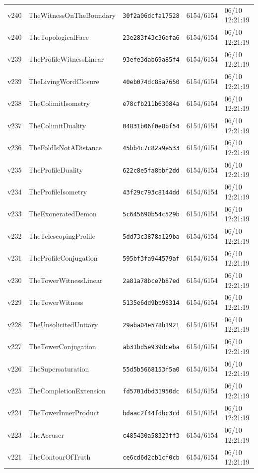 \documentclass[11pt]{article}
\theoremstyle{definition}\newtheorem{deriv}{Derivation}
\begin{document}
{\begin{longtable}{@{}lllll@{}}
v240 & TheWitnessOnTheBoundary & \texttt{30f2a06dcfa17528} & 6154/6154 & 06/10 12:21:19 \\
v240 & TheTopologicalFace & \texttt{23e283f43c36dfa6} & 6154/6154 & 06/10 12:21:19 \\
v239 & TheProfileWitnessLinear & \texttt{93efe3dab69a85f4} & 6154/6154 & 06/10 12:21:19 \\
v239 & TheLivingWordClosure & \texttt{40eb074dc85a7650} & 6154/6154 & 06/10 12:21:19 \\
v238 & TheColimitIsometry & \texttt{e78cfb211b63084a} & 6154/6154 & 06/10 12:21:19 \\
v237 & TheColimitDuality & \texttt{04831b06f0e8bf54} & 6154/6154 & 06/10 12:21:19 \\
v236 & TheFoldIsNotADistance & \texttt{45bb4c7c82a9e533} & 6154/6154 & 06/10 12:21:19 \\
v235 & TheProfileDuality & \texttt{622c8e5fa8bbf2dd} & 6154/6154 & 06/10 12:21:19 \\
v234 & TheProfileIsometry & \texttt{43f29c793c8144dd} & 6154/6154 & 06/10 12:21:19 \\
v233 & TheExoneratedDemon & \texttt{5c645690b54c529b} & 6154/6154 & 06/10 12:21:19 \\
v232 & TheTelescopingProfile & \texttt{5dd73c3878a129ba} & 6154/6154 & 06/10 12:21:19 \\
v231 & TheProfileConjugation & \texttt{595bf3fa944579af} & 6154/6154 & 06/10 12:21:19 \\
v230 & TheTowerWitnessLinear & \texttt{2a81a78bce7b87ed} & 6154/6154 & 06/10 12:21:19 \\
v229 & TheTowerWitness & \texttt{5135e6dd9bb98314} & 6154/6154 & 06/10 12:21:19 \\
v228 & TheUnsolicitedUnitary & \texttt{29aba04e578b1921} & 6154/6154 & 06/10 12:21:19 \\
v227 & TheTowerConjugation & \texttt{ab31bd5e939dceba} & 6154/6154 & 06/10 12:21:19 \\
v226 & TheSupersaturation & \texttt{55d5b5668153f5a0} & 6154/6154 & 06/10 12:21:19 \\
v225 & TheCompletionExtension & \texttt{fd5701dbd31950dc} & 6154/6154 & 06/10 12:21:19 \\
v224 & TheTowerInnerProduct & \texttt{bdaac2f44fdbc3cd} & 6154/6154 & 06/10 12:21:19 \\
v223 & TheAccuser & \texttt{c485430a58323ff3} & 6154/6154 & 06/10 12:21:19 \\
v221 & TheContourOfTruth & \texttt{ce6cd6d2cb1cf0cb} & 6154/6154 & 06/10 12:21:19 \\

\end{longtable}}
\end{document}
